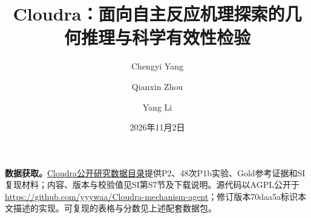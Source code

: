 \documentclass[10pt,twocolumn,a4paper]{article}
\title{Cloudra：面向自主反应机理探索的几何推理与科学有效性检验}
\author{Chengyi Yang \and Qianxin Zhou \and Yang Li}
\date{\small 2026年11月2日}
\makeatletter
\numberwithin{equation}{section}
\renewcommand{\maketitle}{%
  \twocolumn[{%
    {\centering
      {\LARGE\bfseries\@title\par}\vspace{0.6em}
      \vspace{0.6em}
      {\small\@date\par}\vspace{1.2em}}
    \begin{minipage}{\textwidth}
    \small
    \noindent\textbf{摘要}\par\smallskip
    
    \end{minipage}\par\vspace{1.2em}}]%
}
\makeatother
\begin{document}
\maketitle
\setlength{\abovedisplayskip}{6pt plus 1pt minus 1pt}
\setlength{\belowdisplayskip}{6pt plus 1pt minus 1pt}
\setlength{\abovedisplayshortskip}{6pt plus 1pt minus 1pt}
\setlength{\belowdisplayshortskip}{6pt plus 1pt minus 1pt}




\par\noindent\textbf{数据获取。}\href{https://drive.google.com/drive/folders/1yZo3eJuCUuAgedQztgCtLyJcc8MZipf7}{Cloudra公开研究数据目录}提供P2、48次P1b实验、Gold参考证据和SI复现材料；内容、版本与校验值见SI第S7节及下载说明。源代码以AGPL公开于\url{https://github.com/yyywaa/Cloudra-mechanism-agent}；修订版本70daa5a标识本文描述的实现。可复现的表格与分数见上述配套数据包。


\end{document}
